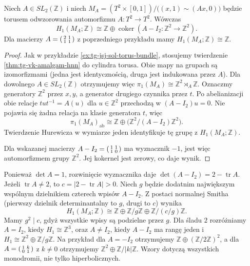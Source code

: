 \begin{stwierdzenie}
\label{st:tg-jsj-mapping-torus-h1}
Niech $A\in SL_2(\mathbb Z)$ i niech
$M_A=(T^2\times[0,1])/\bigl((x,1)\sim(Ax,0)\bigr)$
będzie torusem odwzorowania automorfizmu
$A\colon T^2\to T^2$.
Wówczas
\[
H_1(M_A;\mathbb Z)
\cong\mathbb Z\oplus
\operatorname{coker}(A-I_2:\mathbb Z^2\to\mathbb Z^2).
\]
Dla macierzy
$A=\begin{psmallmatrix}2&1\\1&1\end{psmallmatrix}$
z poprzedniego przykładu mamy
$H_1(M_A;\mathbb Z)\cong\mathbb Z$.
\end{stwierdzenie}

\begin{proof}
Jak w przykładzie \ref{ex:tg-jsj-sol-torus-bundle},
stosujemy twierdzenie \ref{thm:tg-vk-amalgam-hnn}
do cylindra torusa. Obie mapy na grupach są
izomorfizmami (jedna jest identycznością, druga
jest indukowana przez $A$). Dla dowolnego
$A\in SL_2(\mathbb Z)$ otrzymujemy więc
$\pi_1(M_A)\cong\mathbb Z^2\rtimes_A\mathbb Z$.
Oznaczmy generatory $\mathbb Z^2$ przez
$x,y$, a generator drugiego czynnika przez $t$.
Po abelianizacji obie relacje
$tut^{-1}=A(u)$ dla $u\in\mathbb Z^2$
przechodzą w $(A-I_2)u=0$.
Nie pojawia się żadna relacja na klasie
generatora $t$, więc
\[
\pi_1(M_A)_{\mathrm{ab}}
\cong\mathbb Z\oplus
\bigl(\mathbb Z^2/(A-I_2)\mathbb Z^2\bigr).
\]
Twierdzenie Hurewicza w wymiarze jeden
identyfikuje tę grupę z $H_1(M_A;\mathbb Z)$.

Dla wskazanej macierzy
$A-I_2=\begin{psmallmatrix}1&1\\1&0\end{psmallmatrix}$
ma wyznacznik $-1$, jest więc
automorfizmem grupy $\mathbb Z^2$.
Jej kokernel jest zerowy, co daje wynik.
\end{proof}

\begin{uwaga}
Ponieważ $\det A=1$, rozwinięcie wyznacznika
daje $\det(A-I_2)=2-\operatorname{tr}A$.
Jeżeli $\operatorname{tr}A\ne2$, to
$c=|2-\operatorname{tr}A|>0$. Niech $g$ będzie
dodatnim największym wspólnym dzielnikiem
czterech wpisów $A-I_2$. Z postaci normalnej
Smitha (pierwszy dzielnik determinantalny to $g$,
drugi to $c$) wynika
\[
H_1(M_A;\mathbb Z)\cong
\mathbb Z\oplus\mathbb Z/g\mathbb Z
\oplus\mathbb Z/(c/g)\mathbb Z .
\]
Mamy $g^2\mid c$, gdyż wszystkie wpisy są
podzielne przez $g$. Dla śladu $2$ rozróżniamy
$A=I_2$, kiedy $H_1\cong\mathbb Z^3$, oraz
$A\ne I_2$, kiedy $A-I_2$ ma rangę jeden
i $H_1\cong\mathbb Z^2\oplus\mathbb Z/g\mathbb Z$.
Na przykład dla $A=-I_2$ otrzymujemy
$\mathbb Z\oplus(\mathbb Z/2\mathbb Z)^2$,
a dla $A=\begin{psmallmatrix}1&k\\0&1\end{psmallmatrix}$
z $k\ne0$ otrzymujemy
$\mathbb Z^2\oplus\mathbb Z/|k|\mathbb Z$.
Wzory dotyczą wszystkich monodromii, nie tylko
hiperbolicznych.
\end{uwaga}

